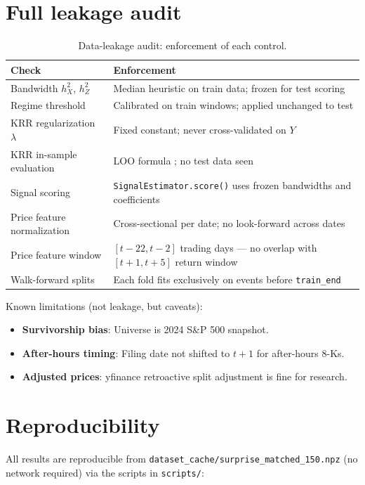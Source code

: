 \documentclass[11pt]{article}
\begin{document}
\section{Full leakage audit}
\label{app:leakage}

\begin{table}[H]
\centering
\caption{Data-leakage audit: enforcement of each control.}
\begin{tabular}{@{}p{5cm}p{8cm}@{}}
\toprule
Check & Enforcement \\
\midrule
Bandwidth $h^2_X$, $h^2_Z$ & Median heuristic on train data; frozen for test scoring \\
Regime threshold & Calibrated on train windows; applied unchanged to test \\
KRR regularization $\lambda$ & Fixed constant; never cross-validated on $Y$ \\
KRR in-sample evaluation & LOO formula \citep{rifkin2004defense}; no test data seen \\
Signal scoring & \texttt{SignalEstimator.score()} uses frozen bandwidths and coefficients \\
Price feature normalization & Cross-sectional per date; no look-forward across dates \\
Price feature window & $[t-22, t-2]$ trading days --- no overlap with $[t+1, t+5]$ return window \\
Walk-forward splits & Each fold fits exclusively on events before \texttt{train\_end} \\
\bottomrule
\end{tabular}
\end{table}

Known limitations (not leakage, but caveats):
\begin{itemize}
  \item \textbf{Survivorship bias}: Universe is 2024 S\&P 500 snapshot.
  \item \textbf{After-hours timing}: Filing date not shifted to $t+1$ for after-hours 8-Ks.
  \item \textbf{Adjusted prices}: yfinance retroactive split adjustment is fine for research.
\end{itemize}

\section{Reproducibility}

All results are reproducible from \texttt{dataset\_cache/surprise\_matched\_150.npz} (no network required) via the scripts in \texttt{scripts/}:
\end{document}
